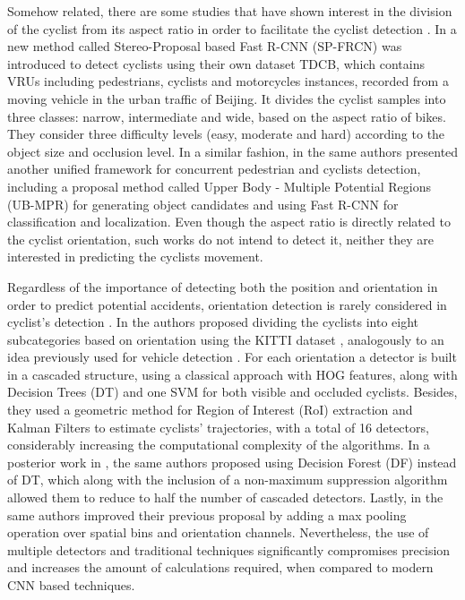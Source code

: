 \documentclass[journal]{IEEEtran}
\begin{document}
Somehow related, there are some studies that have shown interest in the division of the cyclist from its aspect ratio in order to facilitate the cyclist detection \cite{BenchmarkCylistDetect2016,UnifiedCyclist2017}. In \cite{BenchmarkCylistDetect2016} a new method called Stereo-Proposal based Fast R-CNN (SP-FRCN) was introduced to detect cyclists using their own dataset TDCB, which contains VRUs including pedestrians, cyclists and motorcycles instances, recorded from a moving vehicle in the urban traffic of Beijing. It divides the cyclist samples into three classes: narrow, intermediate and wide, based on the aspect ratio of bikes. They consider three difficulty levels (easy, moderate and hard) according to the object size and occlusion level. In a similar fashion, in \cite{UnifiedCyclist2017} the same authors presented another unified framework for concurrent pedestrian and cyclists detection, including a proposal method called Upper Body - Multiple Potential Regions (UB-MPR) for generating object candidates and using Fast R-CNN for classification and localization. Even though the aspect ratio is directly related to the cyclist orientation, such works do not intend to detect it, neither they are interested in predicting the cyclists movement.

Regardless of the importance of detecting both the position and orientation in order to predict potential accidents, orientation detection is rarely considered in cyclist's detection \cite{tian2017detection}. In \cite{tian2015bfast} the authors proposed dividing the cyclists into eight subcategories based on orientation using the KITTI dataset \cite{geiger2012we}, analogously to an idea previously used for vehicle detection \cite{subcategories}. For each orientation a detector is built in a cascaded structure, using a classical approach with HOG features, along with Decision Trees (DT) and one SVM for both visible and occluded cyclists. Besides, they used a geometric method for Region of Interest (RoI) extraction and Kalman Filters to estimate cyclists’ trajectories, with a total of 16 detectors, considerably increasing the computational complexity of the algorithms. In a posterior work in \cite{tian2015afast}, the same authors proposed using Decision Forest (DF) instead of DT, which along with the inclusion of a non-maximum suppression algorithm allowed them to reduce to half the number of cascaded detectors. Lastly, in \cite{tian2017detection} the same authors improved their previous proposal by adding a max pooling operation over spatial bins and orientation channels. Nevertheless, the use of multiple detectors and traditional techniques significantly compromises precision and increases the amount of calculations required, when compared to modern CNN based techniques.
\end{document}

